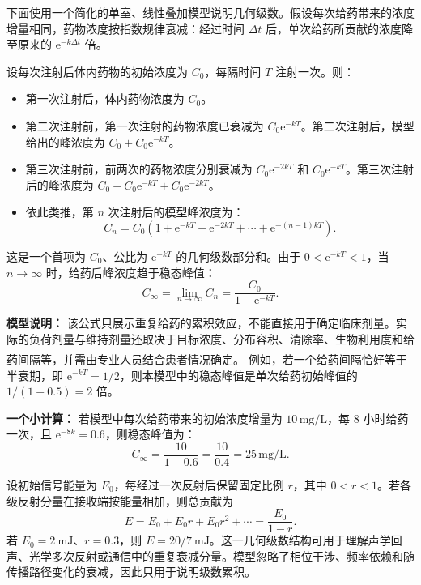 \documentclass[fontset=fandol]{ctexart}
\newcommand{\ee}{\mathrm{e}}
\newcommand{\upcite}[1]{\textsuperscript{\textsuperscript{\cite{#1}}}}
\begin{document}
\begin{application}

下面使用一个简化的单室、线性叠加模型说明几何级数。假设每次给药带来的浓度增量相同，药物浓度按指数规律衰减：经过时间 \(\Delta t\) 后，单次给药所贡献的浓度降至原来的 \(\ee^{-k\Delta t}\) 倍。

设每次注射后体内药物的初始浓度为 \(C_0\)，每隔时间 \(T\) 注射一次。则：
\begin{itemize}
\item 第一次注射后，体内药物浓度为 \(C_0\)。
\item 第二次注射前，第一次注射的药物浓度已衰减为 \(C_0\ee^{-kT}\)。第二次注射后，模型给出的峰浓度为 \(C_0+C_0\ee^{-kT}\)。
\item 第三次注射前，前两次的药物浓度分别衰减为 \(C_0\ee^{-2kT}\) 和 \(C_0\ee^{-kT}\)。第三次注射后的峰浓度为 \(C_0+C_0\ee^{-kT}+C_0\ee^{-2kT}\)。
\item 依此类推，第 \(n\) 次注射后的模型峰浓度为：
\[
C_n=C_0\left(1+\ee^{-kT}+\ee^{-2kT}+\cdots+\ee^{-(n-1)kT}\right).
\]
\end{itemize}

这是一个首项为 \(C_0\)、公比为 \(\ee^{-kT}\) 的几何级数部分和。由于 \(0<\ee^{-kT}<1\)，当 \(n\to\infty\) 时，给药后峰浓度趋于稳态峰值：
\[
C_{\infty}=\lim_{n\to\infty}C_n=\frac{C_0}{1-\ee^{-kT}}.
\]

\textbf{模型说明：} 该公式只展示重复给药的累积效应，不能直接用于确定临床剂量。实际的负荷剂量与维持剂量还取决于目标浓度、分布容积、清除率、生物利用度和给药间隔等，并需由专业人员结合患者情况确定。\upcite{NCBISteadyState} 例如，若一个给药间隔恰好等于半衰期，即 \(\ee^{-kT}=1/2\)，则本模型中的稳态峰值是单次给药初始峰值的 \(1/(1-0.5)=2\) 倍。

\textbf{一个小计算：} 若模型中每次给药带来的初始浓度增量为 \(10\,\text{mg/L}\)，每 8 小时给药一次，且 \(\ee^{-8k}=0.6\)，则稳态峰值为：
\[
C_{\infty} = \frac{10}{1 - 0.6} = \frac{10}{0.4} = 25\,\text{mg/L}.
\]
\end{application}

\begin{application}[工程：多次反射与信号衰减]
设初始信号能量为 $E_0$，每经过一次反射后保留固定比例 $r$，其中 $0<r<1$。若各级反射分量在接收端按能量相加，则总贡献为
\[
E=E_0+E_0r+E_0r^2+\cdots
=\frac{E_0}{1-r}.
\]
若 $E_0=2\ \mathrm{mJ}$、$r=0.3$，则 $E=20/7\ \mathrm{mJ}$。这一几何级数结构可用于理解声学回声、光学多次反射或通信中的重复衰减分量。模型忽略了相位干涉、频率依赖和随传播路径变化的衰减，因此只用于说明级数累积。
\end{application}
\end{document}
